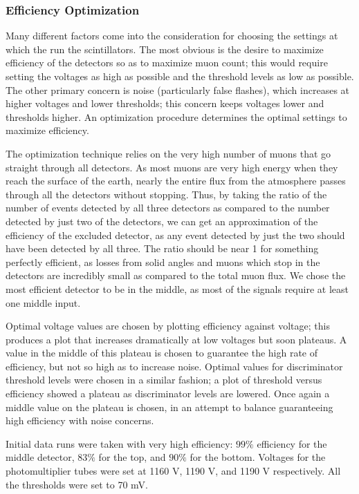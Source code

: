 \subsubsection{Efficiency Optimization}
\label{efficiencyoptimization}

Many different factors come into the consideration for choosing the settings at which the run the scintillators. The most obvious is the desire to maximize efficiency of the detectors so as to maximize muon count; this would require setting the voltages as high as possible and the threshold levels as low as possible. The other primary concern is noise (particularly false flashes), which increases at higher voltages and lower thresholds; this concern keeps voltages lower and thresholds higher. An optimization procedure determines the optimal settings to maximize efficiency.

The optimization technique relies on the very high number of muons that go straight through all detectors. As most muons are very high energy when they reach the surface of the earth, nearly the entire flux from the atmosphere passes through all the detectors without stopping. Thus, by taking the ratio of the number of events detected by all three detectors as compared to the number detected by just two of the detectors, we can get an approximation of the efficiency of the excluded detector, as any event detected by just the two should have been detected by all three. The ratio should be near 1 for something perfectly efficient, as losses from solid angles and muons which stop in the detectors are incredibly small as compared to the total muon flux. We chose the most efficient detector to be in the middle, as most of the signals require at least one middle input.

Optimal voltage values are chosen by plotting efficiency against voltage; this produces a plot that increases dramatically at low voltages but soon plateaus. A value in the middle of this plateau is chosen to guarantee the high rate of efficiency, but not so high as to increase noise. Optimal values for discriminator threshold levels were chosen in a similar fashion; a plot of threshold versus efficiency showed a plateau as discriminator levels are lowered. Once again a middle value on the plateau is chosen, in an attempt to balance guaranteeing high efficiency with noise concerns.

Initial data runs were taken with very high efficiency: $99\%$ efficiency for the middle detector, $83\%$ for the top, and $90\%$ for the bottom. Voltages for the photomultiplier tubes were set at 1160 V, 1190 V, and 1190 V respectively. All the thresholds were set to 70 mV. 

